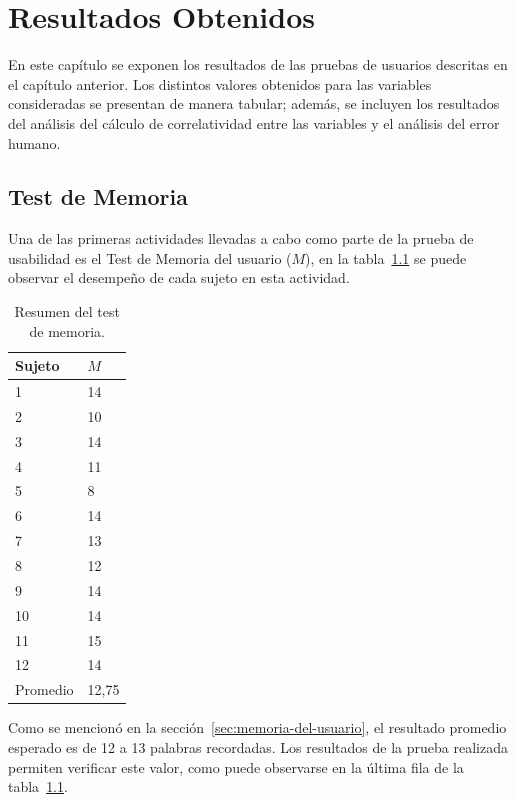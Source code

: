 \chapter{Resultados Obtenidos}
\label{sec:resultados}

En este cap\'itulo se exponen los resultados de las pruebas de usuarios descritas en el cap\'itulo
anterior. Los distintos valores obtenidos para las variables consideradas se presentan de manera
tabular; además, se incluyen los resultados del análisis del cálculo de correlatividad entre las
variables y el análisis del error humano.


\section{Test de Memoria}

Una de las primeras actividades llevadas a cabo como parte de la prueba de usabilidad es 
el Test de Memoria del usuario ($M$), en la tabla~\ref{sec:tabla-memoria} se puede observar
el desempe\~no de cada sujeto en esta actividad.

\begin{table}[H]
\centering
\footnotesize
\begin{tabular}{|p{1.6cm}|p{1.6cm}|}
\hline
    Sujeto & $M$ \\
    \hline 
    1 & 14 \\
    2 & 10 \\
    3 & 14 \\
    4 & 11 \\
    5 & 8 \\
    6 & 14 \\
    7 & 13 \\
    8 & 12 \\
    9 & 14 \\
    10 & 14 \\
    11 & 15 \\
    12 & 14 \\
\hline
Promedio &  12,75 \\
\hline
\end{tabular}
\caption{Resumen del test de memoria.}
\label{sec:tabla-memoria}
\end{table}

Como se mencion\'o en la secci\'on~\ref{sec:memoria-del-usuario}, el resultado promedio esperado es
de 12 a 13 palabras recordadas.
Los resultados de la prueba realizada permiten verificar este valor, como puede observarse en la 
\'ultima fila de la tabla~\ref{sec:tabla-memoria}.

